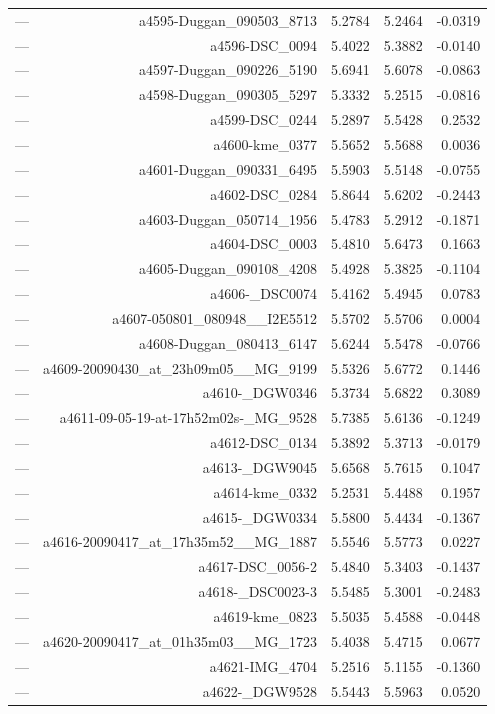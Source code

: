 \begin{table}[htbp]
\begin{tabular}{lrrrr}
— & a4595-Duggan_090503_8713 & 5.2784 & 5.2464 & -0.0319 \\
— & a4596-DSC_0094 & 5.4022 & 5.3882 & -0.0140 \\
— & a4597-Duggan_090226_5190 & 5.6941 & 5.6078 & -0.0863 \\
— & a4598-Duggan_090305_5297 & 5.3332 & 5.2515 & -0.0816 \\
— & a4599-DSC_0244 & 5.2897 & 5.5428 & 0.2532 \\
— & a4600-kme_0377 & 5.5652 & 5.5688 & 0.0036 \\
— & a4601-Duggan_090331_6495 & 5.5903 & 5.5148 & -0.0755 \\
— & a4602-DSC_0284 & 5.8644 & 5.6202 & -0.2443 \\
— & a4603-Duggan_050714_1956 & 5.4783 & 5.2912 & -0.1871 \\
— & a4604-DSC_0003 & 5.4810 & 5.6473 & 0.1663 \\
— & a4605-Duggan_090108_4208 & 5.4928 & 5.3825 & -0.1104 \\
— & a4606-_DSC0074 & 5.4162 & 5.4945 & 0.0783 \\
— & a4607-050801_080948__I2E5512 & 5.5702 & 5.5706 & 0.0004 \\
— & a4608-Duggan_080413_6147 & 5.6244 & 5.5478 & -0.0766 \\
— & a4609-20090430_at_23h09m05__MG_9199 & 5.5326 & 5.6772 & 0.1446 \\
— & a4610-_DGW0346 & 5.3734 & 5.6822 & 0.3089 \\
— & a4611-09-05-19-at-17h52m02s-_MG_9528 & 5.7385 & 5.6136 & -0.1249 \\
— & a4612-DSC_0134 & 5.3892 & 5.3713 & -0.0179 \\
— & a4613-_DGW9045 & 5.6568 & 5.7615 & 0.1047 \\
— & a4614-kme_0332 & 5.2531 & 5.4488 & 0.1957 \\
— & a4615-_DGW0334 & 5.5800 & 5.4434 & -0.1367 \\
— & a4616-20090417_at_17h35m52__MG_1887 & 5.5546 & 5.5773 & 0.0227 \\
— & a4617-DSC_0056-2 & 5.4840 & 5.3403 & -0.1437 \\
— & a4618-_DSC0023-3 & 5.5485 & 5.3001 & -0.2483 \\
— & a4619-kme_0823 & 5.5035 & 5.4588 & -0.0448 \\
— & a4620-20090417_at_01h35m03__MG_1723 & 5.4038 & 5.4715 & 0.0677 \\
— & a4621-IMG_4704 & 5.2516 & 5.1155 & -0.1360 \\
— & a4622-_DGW9528 & 5.5443 & 5.5963 & 0.0520 \\

\end{tabular}
\end{table}
